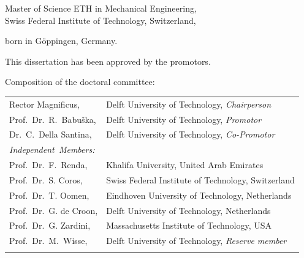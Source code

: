 \begin{titlepage}
\begin{center}
\bigskip
\bigskip

Master of Science ETH in Mechanical Engineering, \\
Swiss Federal Institute of Technology, Switzerland,

born in Göppingen, Germany.

\vspace*{2\bigskipamount}

\end{center}

\clearpage
\thispagestyle{empty}

\noindent This dissertation has been approved by the promotors.


\bigskip
\noindent Composition of the doctoral committee:

\medskip\noindent
\begin{tabular}{p{4.5cm}l}
    Rector Magnificus, & Delft University of Technology, \emph{Chairperson} \\
    Prof.\ Dr.\ R.\ Babu\v{s}ka, & Delft University of Technology, \emph{Promotor} \\
    Dr.\ C.\ Della Santina, & Delft University of Technology, \emph{Co-Promotor} \\

    \medskip
    \mbox{\emph{Independent Members:}} & \\
    Prof.\ Dr.\ F.\ Renda, & Khalifa University, United Arab Emirates \\
    Prof.\ Dr.\ S. Coros, & Swiss Federal Institute of Technology, Switzerland \\
    Prof.\ Dr.\ T. Oomen, & Eindhoven University of Technology, Netherlands\\
    Prof.\ Dr.\ G. de Croon, & Delft University of Technology, Netherlands\\
    Prof.\ Dr.\ G. Zardini, & Massachusetts Institute of Technology, USA\\ %
    Prof.\ Dr.\ M.\ Wisse, & Delft University of Technology, \emph{Reserve member} \\ \\


\end{tabular}
\end{titlepage}
